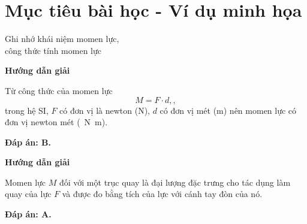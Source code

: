 \section{Mục tiêu bài học - Ví dụ minh họa}
\begin{dang}{Ghi nhớ khái niệm momen lực,\\ công thức tính momen lực}
	{	\begin{center}
			\textbf{Hướng dẫn giải}
		\end{center}
	
	Từ công thức của momen lực		
		\begin{equation*}
			M = F\cdot d, \label{eq1}, 
		\end{equation*}
		trong hệ SI, $F$ có đơn vị là newton (N), $d$ có đơn vị mét (m) nên momen lực có đơn vị newton mét (\SI{}{\newton\meter}).
		
		
		\textbf{Đáp án: B.}
		
	}
	{	\begin{center}
			\textbf{Hướng dẫn giải}
		\end{center}
		
		Momen lực $M$ đối với một trục quay là đại lượng đặc trưng cho tác dụng làm quay của lực $F$ và được đo bằng tích của lực với cánh tay đòn của nó.
		
		\textbf{Đáp án: A.}
		
	}
\end{dang}
